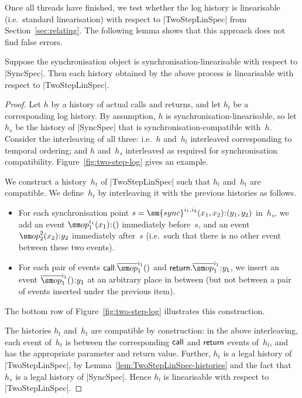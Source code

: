 Once all threads have finished, we test whether the log history is
linearisable (i.e.~standard linearisation) with respect to |TwoStepLinSpec|
from Section~\ref{sec:relating}.
%
The following lemma shows that this approach does not find false errors.
%
\begin{lemma}
\label{lem:two-step-testing}
Suppose the synchronisation object is synchronisation-lin\-ear\-is\-able with
respect to |SyncSpec|.  Then each history obtained by the above process is
linearisable with respect to |TwoStepLinSpec|.
\end{lemma}


\begin{proof}
Let $h$ by a history of actual calls and returns, and let $h_l$ be a
corresponding log history.  By assumption, $h$ is
synchronisation-linearisable, so let $h_s$ be the history of |SyncSpec| that
is synchronisation-compatible with~$h$.  Consider the interleaving of all
three: i.e.~$h$ and~$h_l$ interleaved corresponding to temporal ordering; and
$h$ and~$h_s$ interleaved as required for synchronisation compatibility.
Figure~\ref{fig:two-step-log} gives an example.

We construct a history~$h_t$ of |TwoStepLinSpec| such that $h_l$ and~$h_t$ are
compatible.  We define~$h_t$ by interleaving it with the previous
histories as follows. 
\begin{itemize}
\item For each synchronisation point $s =
  \sm{sync}^{i_1,i_2}(x_1,x_2)\::(y_1,y_2)$ in~$h_s$, we add an event
  $\op_1^{i_1}(x_1)\::()$ immediately before~$s$, and an event
  $\op_2^2(x_2)\::y_2$ immediately after~$s$ (i.e.~such that there is no
  other event between these two events).

\item For each pair of events $\call.\overline\op_1^{i_1}()$ and
  $\return.\overline\op_1^{i_1}\::y_1$, we insert an event
  $\overline\op_1^{i_1}()\::y_1$ at an arbitrary place in between (but not
  between a pair of events inserted under the previous item).
\end{itemize}
%
The bottom row of Figure~\ref{fig:two-step-log} illustrates this construction.

The histories $h_l$ and~$h_t$ are compatible by construction: in the above
interleaving, each event of~$h_t$ is between the corresponding $\mathsf{call}$ and
$\mathsf{return}$ events of~$h_l$, and has the appropriate parameter and return value.
%
Further, $h_t$ is a legal history of |TwoStepLinSpec|, by
Lemma~\ref{lem:TwoStepLinSpec-histories} and the fact that $h_s$ is a legal
history of |SyncSpec|.
%
Hence $h_l$ is linearisable with respect to |TwoStepLinSpec|.
\end{proof}

